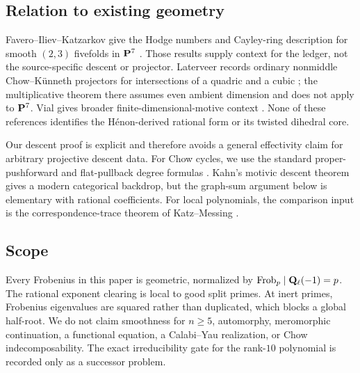 \subsection*{Relation to existing geometry}

Favero--Iliev--Katzarkov give the Hodge numbers and Cayley-ring description
for smooth \((2,3)\) fivefolds in \(\mathbf P^7\)
\cite[\S5.1, equation (6), and \S5.4, equation (8)]{FIK2012}.
Those results supply context for the ledger, not the source-specific
descent or projector.  Laterveer records ordinary nonmiddle
Chow--K\"unneth projectors for intersections of a quadric and a cubic
\cite[proof of Theorem 4.1]{Laterveer2021}; the multiplicative theorem
there assumes even ambient dimension and does not apply to \(\mathbf P^7\).
Vial gives broader finite-dimensional-motive context
\cite[Example 4.12]{Vial2013}.  None of these references identifies the
H\'enon-derived rational form or its twisted dihedral core.

Our descent proof is explicit and therefore avoids a general effectivity
claim for arbitrary projective descent data.  For Chow cycles, we use the
standard proper-pushforward and flat-pullback degree formulas
\cite[\S\S1.4, 1.7]{Fulton1998}.  Kahn's motivic descent theorem
\cite[Theorems 1 and 7.1]{Kahn2023} gives a modern categorical backdrop,
but the graph-sum argument below is elementary with rational coefficients.
For local polynomials, the comparison input is the
correspondence-trace theorem of Katz--Messing
\cite[Theorem 2(2)]{KatzMessing1974}.

\subsection*{Scope}

Every Frobenius in this paper is geometric, normalized by
\(\operatorname{Frob}_p\mid\mathbf Q_\ell(-1)=p\).  The rational exponent clearing is local to
good split primes.  At inert primes, Frobenius eigenvalues are squared
rather than duplicated, which blocks a global half-root.  We do not claim
smoothness for \(n\ge5\), automorphy, meromorphic continuation, a functional
equation, a Calabi--Yau realization, or Chow indecomposability.  The exact
irreducibility gate for the rank-\(10\) polynomial is recorded only as a
successor problem.
